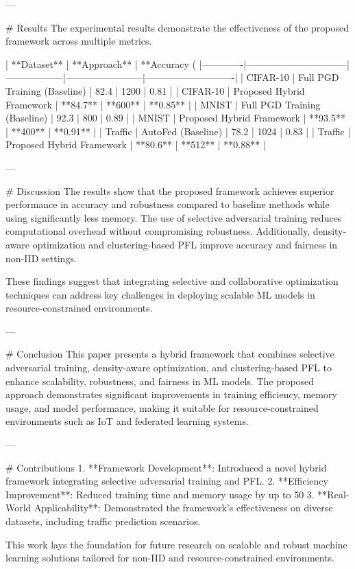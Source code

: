 ---

# Results  
The experimental results demonstrate the effectiveness of the proposed framework across multiple metrics.

| **Dataset** | **Approach**                  | **Accuracy (%
|-------------|--------------------------------|------------------|------------------------|----------------------------|
| CIFAR-10    | Full PGD Training (Baseline)  | 82.4             | 1200                  | 0.81                       |
| CIFAR-10    | Proposed Hybrid Framework     | **84.7**         | **600**               | **0.85**                   |
| MNIST       | Full PGD Training (Baseline)  | 92.3             | 800                   | 0.89                       |
| MNIST       | Proposed Hybrid Framework     | **93.5**         | **400**               | **0.91**                   |
| Traffic     | AutoFed (Baseline)            | 78.2             | 1024                  | 0.83                       |
| Traffic     | Proposed Hybrid Framework     | **80.6**         | **512**               | **0.88**                   |

---

# Discussion  
The results show that the proposed framework achieves superior performance in accuracy and robustness compared to baseline methods while using significantly less memory. The use of selective adversarial training reduces computational overhead without compromising robustness. Additionally, density-aware optimization and clustering-based PFL improve accuracy and fairness in non-IID settings.  

These findings suggest that integrating selective and collaborative optimization techniques can address key challenges in deploying scalable ML models in resource-constrained environments.  

---

# Conclusion  
This paper presents a hybrid framework that combines selective adversarial training, density-aware optimization, and clustering-based PFL to enhance scalability, robustness, and fairness in ML models. The proposed approach demonstrates significant improvements in training efficiency, memory usage, and model performance, making it suitable for resource-constrained environments such as IoT and federated learning systems.  

---

# Contributions  
1. **Framework Development**: Introduced a novel hybrid framework integrating selective adversarial training and PFL.  
2. **Efficiency Improvement**: Reduced training time and memory usage by up to 50%
3. **Real-World Applicability**: Demonstrated the framework's effectiveness on diverse datasets, including traffic prediction scenarios.  

This work lays the foundation for future research on scalable and robust machine learning solutions tailored for non-IID and resource-constrained environments.  